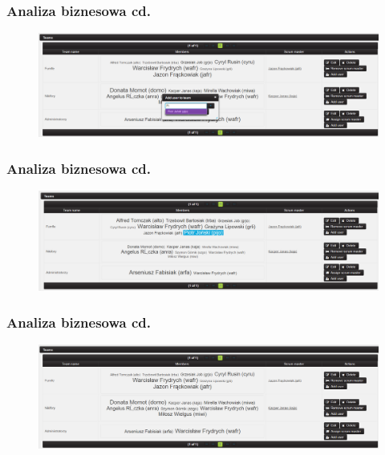 \documentclass[hyperref={pdfpagelabels=false}]{beamer}
\begin{document}
\begin{frame}
	\frametitle{Analiza biznesowa cd.}
	\begin{figure}
		\centering
		\includegraphics[height=0.5\linewidth, width=1\linewidth]{team-list-add}
	\end{figure}
\end{frame}\begin{frame}
\frametitle{Analiza biznesowa cd.}
\begin{figure}
	\centering
	\includegraphics[height=0.5\linewidth, width=1\linewidth]{team-list-del}
\end{figure}
\end{frame}\begin{frame}
\frametitle{Analiza biznesowa cd.}
\begin{figure}
	\centering
	\includegraphics[height=0.5\linewidth, width=1\linewidth]{team-list-del-2}
\end{figure}
\end{frame}
\end{document}
